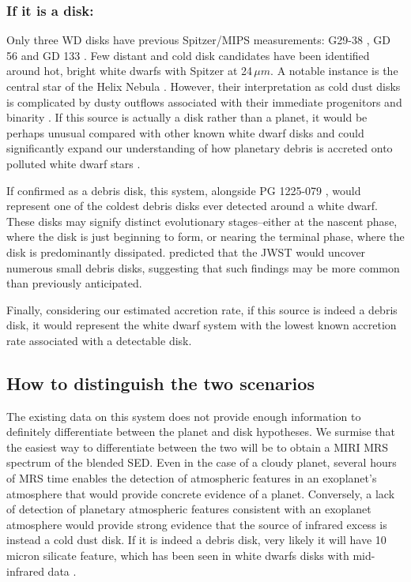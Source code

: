 \documentclass[twocolumn]{aastex631}
\begin{document}
 


\subsubsection{If it is a disk:} 
Only three WD disks have previous Spitzer/MIPS measurements: G29-38 \citep{2005ApJ...635L.161R}, GD 56 and GD 133 \citep{2007ApJ...663.1285J}. Few distant and cold disk candidates have been identified around hot, bright white dwarfs with Spitzer at 24\,$\mu m$. A notable instance is the central star of the Helix Nebula \citep{2007ApJ...657L..41S}. However, their interpretation as cold dust disks is complicated by dusty outflows associated with their immediate progenitors and binarity \citep{2011AJ....142...75C,2014AJ....147..142C}. If this source is actually a disk rather than a planet, it would be {perhaps unusual} compared with other known white dwarf disks and could significantly expand our understanding of how planetary debris is accreted onto polluted white dwarf stars \citep{2020NatAs...4..328C}.

If confirmed as a debris disk, this system, alongside PG 1225-079 \citep{2010ApJ...714.1386F}, would represent one of the coldest debris disks ever detected around a white dwarf. These disks may signify distinct evolutionary stages--either at the nascent phase, where the disk is just beginning to form, or nearing the terminal phase, where the disk is predominantly dissipated. \citet{2017MNRAS.468..154B} predicted that the JWST would uncover numerous small debris disks, suggesting that such findings may be more common than previously anticipated.

Finally, considering our estimated accretion rate, if this source is indeed a debris disk, it would represent the white dwarf system with the lowest known accretion rate associated with a detectable disk.


  

\subsection{How to distinguish the two scenarios} 
The existing data on this system does not provide enough information to definitely differentiate between the planet and disk hypotheses. We surmise that the easiest way to differentiate between the two will be to obtain a MIRI MRS spectrum of the blended SED. Even in the case of a cloudy planet, several hours of MRS time enables the detection of atmospheric features in an exoplanet's atmosphere that would provide concrete evidence of a planet. Conversely, a lack of detection of planetary atmospheric features consistent with an exoplanet atmosphere would provide strong evidence that the source of infrared excess is instead a cold dust disk. If it is indeed a debris disk, very likely it will have 10 micron silicate feature, which has been seen in white dwarfs disks with mid-infrared data \citep{2009AJ....137.3191J,2024MNRAS.529L..41S}.
\end{document}
